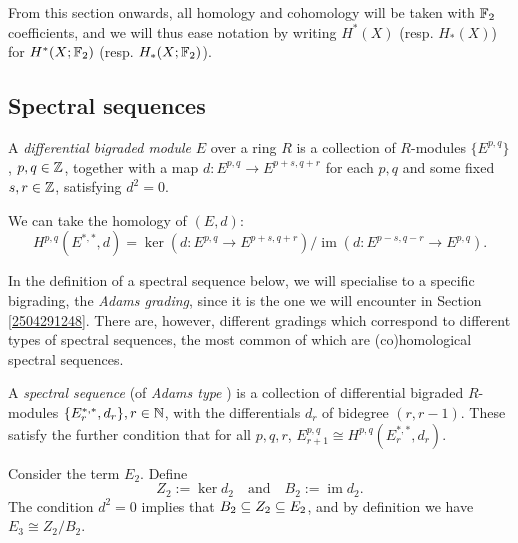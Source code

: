 \documentclass{MetricNotes2023}
\def\bb{\ensuremath\mathbb}
\def\subq{\ensuremath\subseteq}
\def\inte{\ensuremath\mathbb{Z}}
\def\nat{\ensuremath\mathbb{N}}
\DeclareMathOperator{\im}{im}
\def\textcolour{\textcolor}
\begin{document}
From this section onwards, all homology and cohomology will be taken with \(\bb{F}_2\) coefficients, and we will thus ease notation by writing \(H^*(X)\) (resp. \(H_*(X)\)) for \(H^*(X; \bb{F}_2)\) (resp. \(H_*(X;\bb{F}_2)\)).

\subsection{Spectral sequences}\label{2504041910}


\begin{definition}
A \textit{differential bigraded module} \(E\) over a ring \(R\) is a collection of \(R\)-modules \(\{E^{p, q}\}\), \(p, q\in \inte\), together with a map \(d : E^{p, q} \to E^{p+s, q+r}\) for each \(p, q\) and some fixed \(s,r \in \inte\), satisfying \(d^2=0\). 
\end{definition}

We can take the homology of \((E, d)\):
\[H^{p, q}(E^{*, *}, d)=\ker(d : E^{p, q}\to E^{p+s, q+r})/\im(d : E^{p-s, q-r}\to E^{p, q}).\]

In the definition of a spectral sequence below, we will specialise to a specific bigrading, the \textit{Adams grading}, since it is the one we will encounter in Section \ref{2504291248}. There are, however, different gradings which correspond to different types of spectral sequences, the most common of which are (co)homological spectral sequences. 

\begin{definition}
A \textit{spectral sequence} (of \textit{Adams type}%
) is a collection of differential bigraded \(R\)-modules \(\{E^{*, *}_r, d_r\}, r \in \nat\), with the differentials \(d_r\) of bidegree \((r, r-1)\). These satisfy the further condition that for all \(p, q, r\), \(E^{p, q}_{r+1}\cong H^{p, q}(E_r^{*, *}, d_r)\).
\end{definition}

Consider the term \(E_2\). Define 
\[Z_2:=\ker d_2 \quad \text{and} \quad B_2:=\im d_2.\]
The condition \(d^2=0\) implies that \(B_2\subq Z_2\subq E_2\), and by definition we have \(E_3\cong Z_2/B_2\). 
\end{document}
